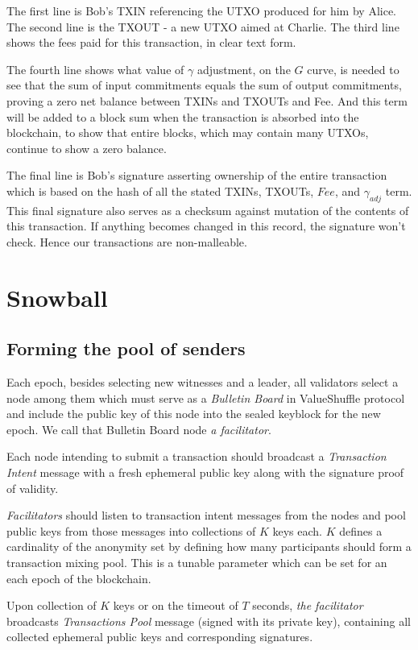 \documentclass[8pt,fleqn,openany]{book}
\begin{document}
The first line is Bob’s TXIN referencing the UTXO produced for him by Alice. The second line is the TXOUT - a new UTXO aimed at Charlie. The third line shows the fees paid for this transaction, in clear text form. 

The fourth line shows what value of $\gamma$ adjustment, on the $G$ curve, is needed to see that the sum of input commitments equals the sum of output commitments, proving a zero net balance between TXINs and TXOUTs and Fee. And this term will be added to a block sum when the transaction is absorbed into the blockchain, to show that entire blocks, which may contain many UTXOs, continue to show a zero balance.

The final line is Bob’s signature asserting ownership of the entire transaction which is based on the hash of all the stated TXINs, TXOUTs, $Fee$, and $\gamma_{adj}$ term. This final signature also serves as a checksum against mutation of the contents of this transaction. If anything becomes changed in this record, the signature won’t check. Hence our transactions are non-malleable.

\chapter{Snowball}\label{app:snowball}

\section{Forming the pool of senders}
Each epoch, besides selecting new witnesses and a leader, all validators select a node among them which must serve as a \textit{Bulletin Board} in ValueShuffle protocol and include the public key of this node into the sealed keyblock for the new epoch. We call that Bulletin Board node \textit{a facilitator}.

Each node intending to submit a transaction should broadcast a \textit{Transaction Intent} message with a fresh ephemeral public key along with the signature proof of validity.

\textit{Facilitators} should listen to transaction intent messages from the nodes and pool public keys from those messages into collections of $K$ keys each. $K$ defines a cardinality of the anonymity set by defining how many participants should form a transaction mixing pool. This is a tunable parameter which can be set for an each epoch of the blockchain. 

Upon collection of $K$ keys or on the timeout of $T$ seconds, \textit{the facilitator} broadcasts \textit{Transactions Pool} message (signed with its private key), containing all collected ephemeral public keys and corresponding signatures.
\end{document}
